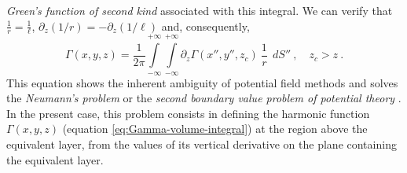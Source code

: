 \textit{Green's function of second kind} \citep[][ p. 246]{kellogg1967} 
associated with this integral.
We can verify that $\frac{1}{r} = \frac{1}{\ell}$, $\partial_{z} (1/r) = -\partial_{z} (1/\ell)$
and, consequently, 
\begin{equation}
\Gamma(x, y, z) = \frac{1}{2\pi}
\int\limits_{-\infty}^{+\infty}\int\limits_{-\infty}^{+\infty}
\partial_{z} \Gamma(x'', y'', z_{c}) \: \frac{1}{r} 
\:\: dS'' \: , \quad z_{c} > z \: .
\label{eq:Neumann_bvp}
\end{equation}
This equation shows the inherent ambiguity of potential field methods
\citep{roy1962} and solves the \textit{Neumann's problem} or the 
\textit{second boundary value problem of potential theory} \citep[][ p. 246]{kellogg1967}.
In the present case, this problem consists in defining the harmonic function $\Gamma(x, y, z)$ 
(equation \ref{eq:Gamma-volume-integral}) at the region above the equivalent layer,
from the values of its vertical derivative on the plane containing the equivalent layer. 